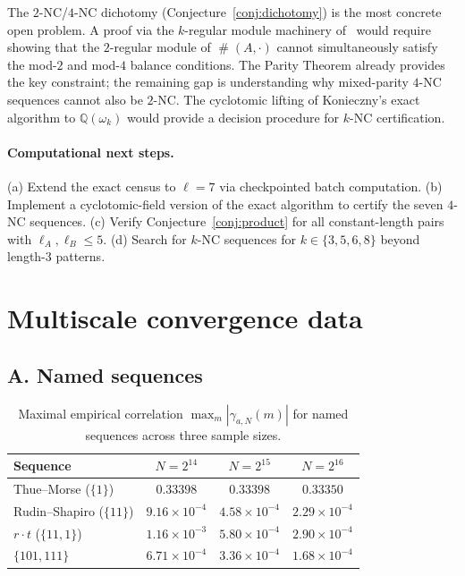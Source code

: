 \documentclass[11pt]{article}
\theoremstyle{definition}
\DeclareMathOperator{\occ}{\#}
\begin{document}
The $2$-NC/$4$-NC dichotomy (Conjecture~\ref{conj:dichotomy}) is the
most concrete open problem.  A proof via the $k$-regular module
machinery of~\cite{AS92} would require showing that the $2$-regular
module of $\occ(A,\cdot)$ cannot simultaneously satisfy the mod-$2$
and mod-$4$ balance conditions.  The Parity Theorem already provides
the key constraint; the remaining gap is understanding why mixed-parity
$4$-NC sequences cannot also be $2$-NC.  The cyclotomic lifting of
Konieczny's exact algorithm to $\mathbb{Q}(\omega_k)$ would provide
a decision procedure for $k$-NC certification.

\paragraph{Computational next steps.}
(a) Extend the exact census to $\ell = 7$ via checkpointed batch
computation. (b) Implement a cyclotomic-field version of the exact
algorithm to certify the seven $4$-NC sequences. (c) Verify
Conjecture~\ref{conj:product} for all constant-length pairs with
$\ell_A, \ell_B \leq 5$. (d) Search for $k$-NC sequences for
$k \in \{3,5,6,8\}$ beyond length-3 patterns.

\appendix
\section{Multiscale convergence data}
\label{app:multiscale}

\subsection*{A. Named sequences}

\begin{table}[ht]
\centering
\caption{Maximal empirical correlation $\max_m|\gamma_{a,N}(m)|$ for
         named sequences across three sample sizes.}
\begin{tabular}{lccc}
\toprule
Sequence & $N = 2^{14}$ & $N = 2^{15}$ & $N = 2^{16}$ \\
\midrule
Thue--Morse ($\{1\}$)     & $0.33398$ & $0.33398$ & $0.33350$ \\
Rudin--Shapiro ($\{11\}$) & $9.16\times10^{-4}$ & $4.58\times10^{-4}$ & $2.29\times10^{-4}$ \\
$r \cdot t$ ($\{11,1\}$)  & $1.16\times10^{-3}$ & $5.80\times10^{-4}$ & $2.90\times10^{-4}$ \\
$\{101,111\}$             & $6.71\times10^{-4}$ & $3.36\times10^{-4}$ & $1.68\times10^{-4}$ \\
\bottomrule
\end{tabular}
\end{table}
\end{document}
